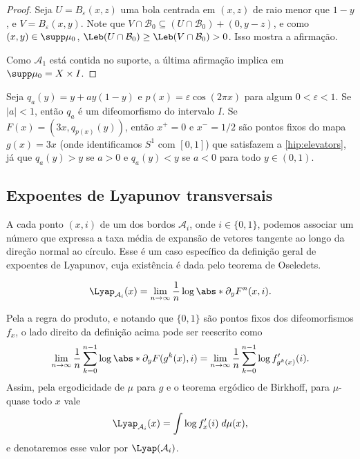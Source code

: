 \documentclass[../fapesp0]{subfiles}
\begin{document}
\begin{proof}
  Seja \(U = B_{\varepsilon}(x,z)\) uma bola centrada em \((x, z)\) de raio menor que \(1 - y\), e \(V = B_{\varepsilon}(x,y)\). Note que \(V \cap \mathcal{B}_0 \subseteq (U \cap \mathcal{B}_0) + (0, y - z)\), e como \((x,y) \in \supp \mu_0\), \(\Leb(U \cap \mathcal{B}_0) \geq \Leb(V \cap \mathcal{B}_0) > 0\). Isso mostra a afirmação.
  
  Como \(\mathcal{A}_1\) está contida no suporte, a última afirmação implica em \(\supp \mu_0 = X \times I\).
\end{proof}

\begin{example}\label{ex:intermingled}
  Seja \(q_a(y) = y + ay(1 - y)\) e \(p(x) = \varepsilon \cos(2 \pi x)\) para algum \(0 < \varepsilon < 1\). Se \(\lvert a \rvert < 1\), então \(q_a\) é um difeomorfismo do intervalo \(I\). Se \(F(x) = (3x, q_{p(x)}(y))\), então \(x^+ = 0\) e \(x^- = 1/2\) são pontos fixos do mapa \(g(x) = 3x\) (onde identificamos \(S^1\) com \([0,1]\)) que satisfazem a \cref{hip:elevators}, já que \(q_a(y) > y\) se \(a > 0\) e \(q_a(y) < y\) se \(a < 0\) para todo \(y \in (0,1)\).
\end{example}

\subsection{Expoentes de Lyapunov transversais}

A cada ponto \((x,i)\) de um dos bordos \(\mathcal{A}_i\), onde \(i \in \{ 0,1 \}\), podemos associar um número que expressa a taxa média de expansão de vetores tangente ao longo da direção normal ao círculo. Esse é um caso específico da definição geral de expoentes de Lyapunov, cuja existência é dada pelo teorema de Oseledets.

\begin{definition}
  \begin{equation*}
    \Lyap_{\mathcal{A}_i}(x) = \lim_{n \to \infty}\frac{1}{n} \log \abs*{ \partial_y F^{n}(x,i) }.
  \end{equation*}
\end{definition}
Pela a regra do produto, e notando que \(\{ 0,1 \}\) são pontos fixos dos difeomorfismos \(f_x\), o lado direito da definição acima pode ser reescrito como
\begin{equation*}
  \lim_{n \to \infty}\frac{1}{n} \sum_{k = 0}^{n - 1} \log \abs*{\partial_y F(g^k(x),i)}
  = \lim_{n \to \infty}\frac{1}{n} \sum_{k = 0}^{n - 1} \log f_{g^k(x)}'(i).
\end{equation*}
Assim, pela ergodicidade de \(\mu\) para \(g\) e o teorema ergódico de Birkhoff, para \(\mu\)-quase todo \(x\) vale
\begin{equation}\label{eq:trav-lyap}
  \Lyap_{\mathcal{A}_i}(x) = \int \log f_{x}'(i) \;d \mu(x),
\end{equation}
e denotaremos esse valor por \(\Lyap(\mathcal{A}_i)\).
\end{document}
